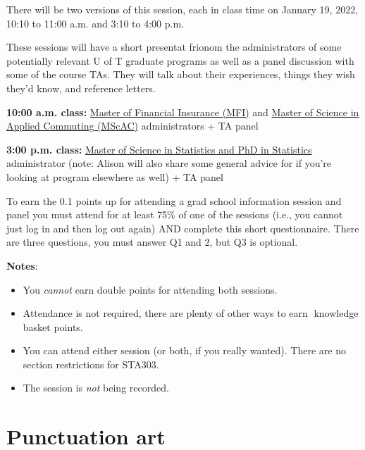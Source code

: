 \documentclass[
  openany]{book}
\providecommand{\tightlist}{%
  \setlength{\itemsep}{0pt}\setlength{\parskip}{0pt}}
\begin{document}
There will be two versions of this session, each in class time on January 19, 2022, 10:10 to 11:00 a.m. and 3:10 to 4:00 p.m.

These sessions will have a short presentat frionom the administrators of some potentially relevant U of T graduate programs as well as a panel discussion with some of the course TAs. They will talk about their experiences, things they wish they'd know, and reference letters.

\textbf{10:00 a.m. class:} \href{https://mfi.utoronto.ca/}{Master of Financial Insurance (MFI)} and \href{https://mscac.utoronto.ca/}{Master of Science in Applied Commuting (MScAC)} administrators + TA panel

\textbf{3:00 p.m. class:} \href{https://www.statistics.utoronto.ca/future-students/our-graduate-programs}{Master of Science in Statistics and PhD in Statistics} administrator (note: Alison will also share some general advice for if you're looking at program elsewhere as well) + TA panel

To earn the 0.1 points up for attending a grad school information session and panel you must attend for at least 75\% of one of the sessions (i.e., you cannot just log in and then log out again) AND complete this short questionnaire. There are three questions, you must answer Q1 and 2, but Q3 is optional.

\textbf{Notes}:

\begin{itemize}
\tightlist
\item
  You \emph{cannot} earn double points for attending both sessions.\\
\item
  Attendance is not required, there are plenty of other ways to earn 🧺knowledge basket points.\\
\item
  You can attend either session (or both, if you really wanted). There are no section restrictions for STA303.
\item
  The session is \emph{not} being recorded.
\end{itemize}

\hypertarget{punctuation-art}{%
\section{Punctuation art}\label{punctuation-art}}
\end{document}
